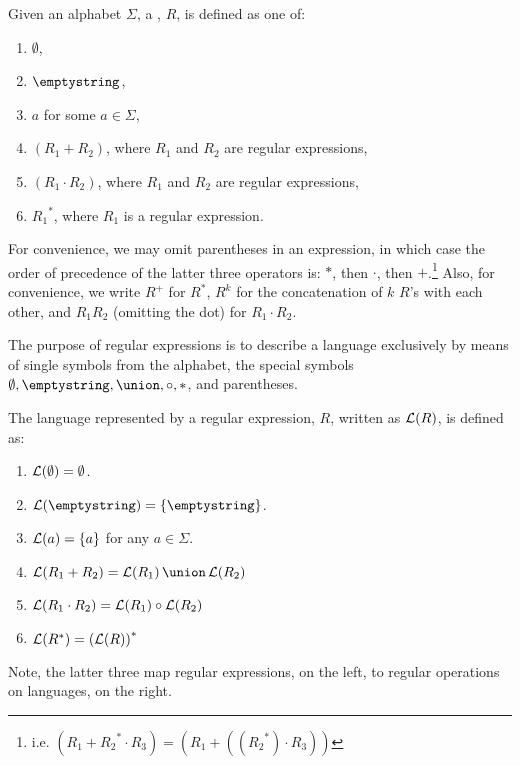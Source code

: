\documentclass[twoside,letterpaper,openany]{book}
\begin{document}
\begin{defn}
Given an alphabet $\Sigma$, a , $R$, is defined as one of:
\begin{enumerate}
\item $\emptyset$,
\item $\emptystring$,
\item $a$ for some $a \in \Sigma$,
\item $(R_1 + R_2)$, where $R_1$ and $R_2$ are regular expressions,
\item $(R_1 \cdot R_2)$, where $R_1$ and $R_2$ are regular expressions,
\item ${R_1}^*$, where $R_1$ is a regular expression.
\end{enumerate}

For convenience, we may omit parentheses in an expression, in which case the order of precedence of the latter three operators is: $*$, then $\cdot$, then $+$.\footnote{i.e. $(R_1 + {R_2}^* \cdot R_3) = (R_1 + (({R_2}^*) \cdot R_3))$ } Also, for convenience, we write $R^+$ for $R^*$, $R^k$ for the concatenation of $k$ $R$'s with each other, and $R_1 R_2$ (omitting the dot) for $R_1 \cdot R_2$.
\end{defn}

\begin{discussion}
The purpose of regular expressions is to describe a language exclusively by means of single symbols from the alphabet, the special symbols $\emptyset, \emptystring, \union, \circ, *$, and parentheses.
\end{discussion}

\begin{defn}
The language represented by a regular expression, $R$, written as $\mathcal{L}(R)$, is defined as:
\begin{enumerate}
\item $\mathcal{L}(\emptyset) = \emptyset$.
\item $\langof\emptystring = \setdef\emptystring$.
\item $\mathcal{L}(a) = \left\lbrace a \right\rbrace$ for any $a \in \Sigma$.
\item $\langof{R_1 + R_2} = \setunion{\langof{R_1}}{\langof{R_2}}$
\item $\mathcal{L}(R_1 \cdot R_2) = {\mathcal{L}(R_1)}\circ{\mathcal{L}(R_2)}$
\item $\mathcal{L}(R^*) = \left(\mathcal{L}(R)\right)^*$
\end{enumerate}
Note, the latter three map regular expressions, on the left, to regular operations on languages, on the right.
\end{defn}
\end{document}
